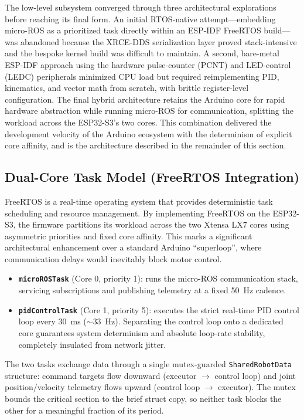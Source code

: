 The low-level subsystem converged through three architectural explorations before reaching its final form. An initial RTOS-native attempt---embedding micro-ROS as a prioritized task directly within an ESP-IDF FreeRTOS build---was abandoned because the XRCE-DDS serialization layer proved stack-intensive and the bespoke kernel build was difficult to maintain. A second, bare-metal ESP-IDF approach using the hardware pulse-counter (PCNT) and LED-control (LEDC) peripherals minimized CPU load but required reimplementing PID, kinematics, and vector math from scratch, with brittle register-level configuration. The final hybrid architecture retains the Arduino core for rapid hardware abstraction while running micro-ROS for communication, splitting the workload across the ESP32-S3's two cores. This combination delivered the development velocity of the Arduino ecosystem with the determinism of explicit core affinity, and is the architecture described in the remainder of this section.

\subsection{Dual-Core Task Model (FreeRTOS Integration)}
\label{subsec:dualcore_tasks}

FreeRTOS is a real-time operating system that provides deterministic task scheduling and resource management. By implementing FreeRTOS on the ESP32-S3, the firmware partitions its workload across the two Xtensa LX7 cores using asymmetric priorities and fixed core affinity. This marks a significant architectural enhancement over a standard Arduino ``superloop'', where communication delays would inevitably block motor control.

\begin{itemize}
    \item \textbf{\texttt{microROSTask}} (Core 0, priority 1): runs the micro-ROS communication stack, servicing subscriptions and publishing telemetry at a fixed 50~Hz cadence.
    \item \textbf{\texttt{pidControlTask}} (Core 1, priority 5): executes the strict real-time PID control loop every 30~ms ($\sim$33~Hz). Separating the control loop onto a dedicated core guarantees system determinism and absolute loop-rate stability, completely insulated from network jitter.
\end{itemize}

The two tasks exchange data through a single mutex-guarded \texttt{SharedRobotData} structure: command targets flow downward (executor $\rightarrow$ control loop) and joint position/velocity telemetry flows upward (control loop $\rightarrow$ executor). The mutex bounds the critical section to the brief struct copy, so neither task blocks the other for a meaningful fraction of its period.


